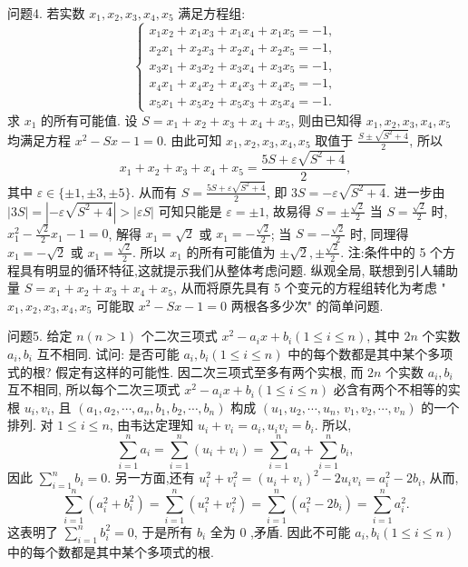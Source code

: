 问题4. 若实数 $x_1, x_2, x_3, x_4, x_5$ 满足方程组:
$$
\left\{\begin{array}{l}
x_1 x_2+x_1 x_3+x_1 x_4+x_1 x_5=-1, \\
x_2 x_1+x_2 x_3+x_2 x_4+x_2 x_5=-1, \\
x_3 x_1+x_3 x_2+x_3 x_4+x_3 x_5=-1, \\
x_4 x_1+x_4 x_2+x_4 x_3+x_4 x_5=-1, \\
x_5 x_1+x_5 x_2+x_5 x_3+x_5 x_4=-1 .
\end{array}\right.
$$
求 $x_1$ 的所有可能值.
设 $S=x_1+x_2+x_3+x_4+x_5$, 则由已知得 $x_1, x_2, x_3, x_4, x_5$ 均满足方程 $x^2-S x-1=0$.
由此可知 $x_1, x_2, x_3, x_4, x_5$ 取值于 $\frac{S \pm \sqrt{S^2+4}}{2}$, 所以
$$
x_1+x_2+x_3+x_4+x_5=\frac{5 S+\varepsilon \sqrt{S^2+4}}{2},
$$
其中 $\varepsilon \in\{ \pm 1, \pm 3, \pm 5\}$. 从而有 $S=\frac{5 S+\varepsilon \sqrt{S^2+4}}{2}$, 即 $3 S=-\varepsilon \sqrt{S^2+4}$.
进一步由 $|3 S|=\left|-\varepsilon \sqrt{S^2+4}\right|>|\varepsilon S|$ 可知只能是 $\varepsilon= \pm 1$, 故易得 $S= \pm \frac{\sqrt{2}}{2}$
当 $S=\frac{\sqrt{2}}{2}$ 时, $x_1^2-\frac{\sqrt{2}}{2} x_1-1=0$, 解得 $x_1=\sqrt{2}$ 或 $x_1=-\frac{\sqrt{2}}{2}$; 当 $S=-\frac{\sqrt{2}}{2}$ 时, 同理得 $x_1=-\sqrt{2}$ 或 $x_1=\frac{\sqrt{2}}{2}$.
所以 $x_1$ 的所有可能值为 $\pm \sqrt{2}, \pm \frac{\sqrt{2}}{2}$.
注:条件中的 5 个方程具有明显的循环特征,这就提示我们从整体考虑问题.
纵观全局, 联想到引人辅助量 $S=x_1+x_2+x_3+x_4+x_5$, 从而将原先具有 5 个变元的方程组转化为考虑 " $x_1, x_2, x_3, x_4, x_5$ 可能取 $x^2-S x-1=0$ 两根各多少次" 的简单问题.



问题5. 给定 $n(n>1)$ 个二次三项式 $x^2-a_i x+b_i(1 \leqslant i \leqslant n)$, 其中 $2 n$ 个实数 $a_i, b_i$ 互不相同.
试问: 是否可能 $a_i, b_i(1 \leqslant i \leqslant n)$ 中的每个数都是其中某个多项式的根? 
假定有这样的可能性.
因二次三项式至多有两个实根, 而 $2 n$ 个实数 $a_i, b_i$ 互不相同, 所以每个二次三项式 $x^2-a_i x+b_i(1 \leqslant i \leqslant n)$ 必含有两个不相等的实根 $u_i, v_i$, 且 $\left(a_1, a_2, \cdots, a_n, b_1, b_2, \cdots, b_n\right)$ 构成 $\left(u_1, u_2, \cdots, u_n\right.$, $\left.v_1, v_2, \cdots, v_n\right)$ 的一个排列.
对 $1 \leqslant i \leqslant n$, 由韦达定理知 $u_i+v_i=a_i, u_i v_i=b_i$. 所以,
$$
\sum_{i=1}^n a_i=\sum_{i=1}^n\left(u_i+v_i\right)=\sum_{i=1}^n a_i+\sum_{i=1}^n b_i,
$$
因此 $\sum_{i=1}^n b_i=0$.
另一方面,还有 $u_i^2+v_i^2=\left(u_i+v_i\right)^2-2 u_i v_i=a_i^2-2 b_i$, 从而,
$$
\sum_{i=1}^n\left(a_i^2+b_i^2\right)=\sum_{i=1}^n\left(u_i^2+v_i^2\right)=\sum_{i=1}^n\left(a_i^2-2 b_i\right)=\sum_{i=1}^n a_i^2 .
$$
这表明了 $\sum_{i=1}^n b_i^2=0$, 于是所有 $b_i$ 全为 0 ,矛盾.
因此不可能 $a_i, b_i(1 \leqslant i \leqslant n)$ 中的每个数都是其中某个多项式的根.



